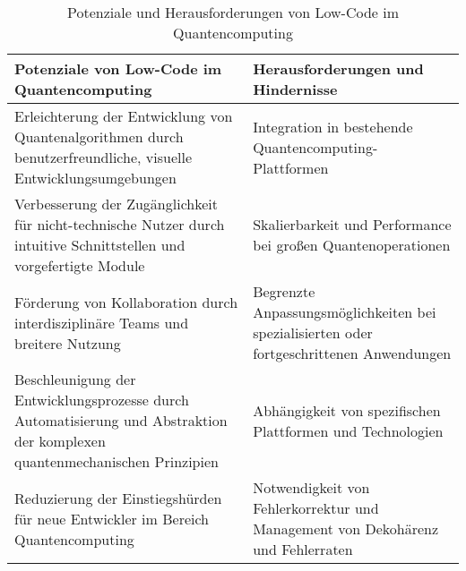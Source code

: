 \begin{table}[h!]
    \centering
    \begin{tabular}{|p{7cm}|p{7cm}|}
    \hline
    \textbf{Potenziale von Low-Code im Quantencomputing} & \textbf{Herausforderungen und Hindernisse} \\
    \hline
    Erleichterung der Entwicklung von Quantenalgorithmen durch benutzerfreundliche, visuelle Entwicklungsumgebungen & Integration in bestehende Quantencomputing-Plattformen \\
    \hline
    Verbesserung der Zugänglichkeit für nicht-technische Nutzer durch intuitive Schnittstellen und vorgefertigte Module & Skalierbarkeit und Performance bei großen Quantenoperationen \\
    \hline
    Förderung von Kollaboration durch interdisziplinäre Teams und breitere Nutzung & Begrenzte Anpassungsmöglichkeiten bei spezialisierten oder fortgeschrittenen Anwendungen \\
    \hline
    Beschleunigung der Entwicklungsprozesse durch Automatisierung und Abstraktion der komplexen quantenmechanischen Prinzipien & Abhängigkeit von spezifischen Plattformen und Technologien \\
    \hline
    Reduzierung der Einstiegshürden für neue Entwickler im Bereich Quantencomputing & Notwendigkeit von Fehlerkorrektur und Management von Dekohärenz und Fehlerraten \\
    \hline
    \end{tabular}
    \caption{Potenziale und Herausforderungen von Low-Code im Quantencomputing}
    \label{tab:lowcode_potentials_challenges}
\end{table}
    


